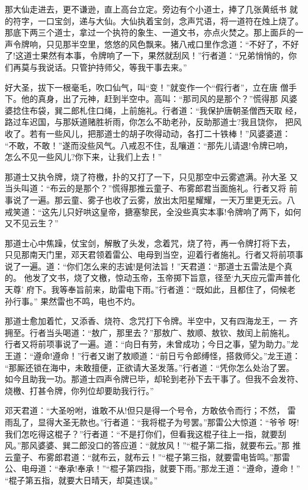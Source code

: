 那大仙走进去，更不谦逊，直上高台立定。旁边有个小道士，捧了几张黄纸书
就的符字，一口宝剑，递与大仙。大仙执着宝剑，念声咒语，将一道符在烛上烧了。
那底下两三个道士，拿过一个执符的象生、一道文书，亦点火焚之。那上面乒的一
声令牌响，只见那半空里，悠悠的风色飘来。猪八戒口里作念道：“不好了，不好
了!这道士果然有本事，令牌响了一下，果然就刮风！”行者道：“兄弟悄悄的，你
们再莫与我说话。只管护持师父，等我干事去来。”

好大圣，拔下一根毫毛，吹口仙气，叫“变！”就变作一个“假行者”，立在唐
僧手下。他的真身，出了元神，赶到半空中。高叫：“那司风的是那个？”慌得那
风婆婆捻住布袋，巽二郎札住口绳，上前施礼。行者道：“我保护唐朝圣僧西天取
经，路过车迟国，与那妖道赌胜祈雨，你怎么不助老孙，反助那道士?我且饶你，
把风收了。若有一些风儿，把那道士的胡子吹得动动，各打二十铁棒！”风婆婆道：
“不敢，不敢！”遂而没些风气。八戒忍不住，乱嚷道：“那先儿请退!令牌已响，
怎么不见一些风儿?你下来，让我们上去！”

那道士又执令牌，烧了符檄，扑的又打了一下，只见那空中云雾遮满。孙大圣
又当头叫道：“布云的是那个？”慌得那推云童子、布雾郎君当面施礼。行者又将
前事说了一遍。那云童、雾子也收了云雾，放出太阳星耀耀，一天万里更无云。八
戒笑道：“这先儿只好哄这皇帝，搪塞黎民，全没些真实本事!令牌响了两下，如何
又不见云生？”

那道士心中焦躁，仗宝剑，解散了头发，念着咒，烧了符，再一令牌打将下去，
只见那南天门里，邓天君领着雷公、电母到当空，迎着行者施礼。行者又将前项事
说了一遍。道：“你们怎么来的志诚!是何法旨！”天君道：“那道士五雷法是个真的。
他发了文书，烧了文檄，惊动玉帝，玉帝掷下旨意，径至‘九天应元雷声普化天尊’
府下。我等奉旨前来，助雷电下雨。”行者道：“既如此，且都住了，伺候老孙行事。”
果然雷也不鸣，电也不灼。

那道士愈加着忙，又添香、烧符、念咒打下令牌。半空中，又有四海龙王，一
齐拥至。行者当头喝道：“敖广，那里去？”那敖广、敖顺、敖钦、敖闰上前施礼。
行者又将前项事说了一遍。道：“向日有劳，未曾成功；今日之事，望为助力。”龙
王道：“遵命!遵命！”行者又谢了敖顺道：“前日亏令郎缚怪，搭救师父。”龙王道：
“那厮还锁在海中，未敢擅便，正欲请大圣发落。”行者道：“凭你怎么处治了罢。
如今且助我一功。那道士四声令牌已毕，却轮到老孙下去干事了。但我不会发符、
烧檄、打甚令牌，你列位却要助我行行。”

邓天君道：“大圣吩咐，谁敢不从!但只是得一个号令，方敢依令而行；不然，
雷雨乱了，显得大圣无款也。”行者道：“我将棍子为号罢。”那雷公大惊道：“爷爷
呀!我们怎吃得这棍子？”行者道：“不是打你们，但看我这棍子往上一指，就要刮
风。”那风婆婆、巽二郎没口的答应道：“就放风！”“棍子第二指，就要布云。”那
推云童子、布雾郎君道：“就布云，就布云！”“棍子第三指，就要雷电皆鸣。”那雷
公、电母道：“奉承!奉承！”“棍子第四指，就要下雨。”那龙王道：“遵命，遵命！”
“棍子第五指，就要大日晴天，却莫违误。”

